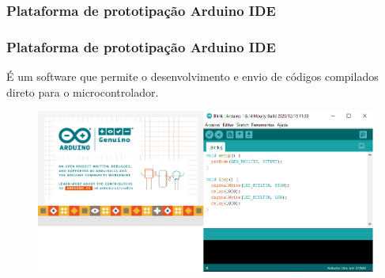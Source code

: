 \subsubsection{Plataforma de prototipação Arduino IDE}

\begin{frame}
\frametitle{Plataforma de prototipação Arduino IDE}

É um software que permite o desenvolvimento e envio de códigos compilados direto para o microcontrolador.

\begin{figure}
\centering
\includegraphics[scale = 0.4]{figs/idearduino}
\end{figure}

\end{frame}
